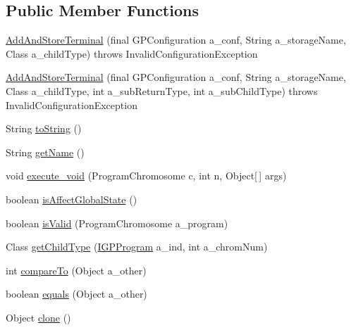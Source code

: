 \subsection*{Public Member Functions}
\begin{DoxyCompactItemize}
\item 
\hyperlink{classorg_1_1jgap_1_1gp_1_1function_1_1_add_and_store_terminal_a253d1d1b4d0ef317cc89bb8dc2aaae93}{Add\-And\-Store\-Terminal} (final G\-P\-Configuration a\-\_\-conf, String a\-\_\-storage\-Name, Class a\-\_\-child\-Type)  throws Invalid\-Configuration\-Exception 
\item 
\hyperlink{classorg_1_1jgap_1_1gp_1_1function_1_1_add_and_store_terminal_a603aceebaab47f1c79bcfabe0c0a0244}{Add\-And\-Store\-Terminal} (final G\-P\-Configuration a\-\_\-conf, String a\-\_\-storage\-Name, Class a\-\_\-child\-Type, int a\-\_\-sub\-Return\-Type, int a\-\_\-sub\-Child\-Type)  throws Invalid\-Configuration\-Exception 
\item 
String \hyperlink{classorg_1_1jgap_1_1gp_1_1function_1_1_add_and_store_terminal_af529ea2032b2ab2da3b4b1a1257daba4}{to\-String} ()
\item 
String \hyperlink{classorg_1_1jgap_1_1gp_1_1function_1_1_add_and_store_terminal_abbe2ab039a01b790be172e3378aa19ba}{get\-Name} ()
\item 
void \hyperlink{classorg_1_1jgap_1_1gp_1_1function_1_1_add_and_store_terminal_a97d517950ee49ea37e8c56f2d171065a}{execute\-\_\-void} (Program\-Chromosome c, int n, Object\mbox{[}$\,$\mbox{]} args)
\item 
boolean \hyperlink{classorg_1_1jgap_1_1gp_1_1function_1_1_add_and_store_terminal_ad630fed4126ace4f4fb0a2083b063b7b}{is\-Affect\-Global\-State} ()
\item 
boolean \hyperlink{classorg_1_1jgap_1_1gp_1_1function_1_1_add_and_store_terminal_af6de474aac647abfeda2d72b18eda760}{is\-Valid} (Program\-Chromosome a\-\_\-program)
\item 
Class \hyperlink{classorg_1_1jgap_1_1gp_1_1function_1_1_add_and_store_terminal_a122727d023e1954671f3b32607b65ee3}{get\-Child\-Type} (\hyperlink{interfaceorg_1_1jgap_1_1gp_1_1_i_g_p_program}{I\-G\-P\-Program} a\-\_\-ind, int a\-\_\-chrom\-Num)
\item 
int \hyperlink{classorg_1_1jgap_1_1gp_1_1function_1_1_add_and_store_terminal_a035feb57f8cb8fc3c9ad397f686f86db}{compare\-To} (Object a\-\_\-other)
\item 
boolean \hyperlink{classorg_1_1jgap_1_1gp_1_1function_1_1_add_and_store_terminal_a8e78f60d9a9df2bd8f7f5c295ebb8d1b}{equals} (Object a\-\_\-other)
\item 
Object \hyperlink{classorg_1_1jgap_1_1gp_1_1function_1_1_add_and_store_terminal_a1d9029480508cb1e803f2ec6e2ffb227}{clone} ()
\end{DoxyCompactItemize}
